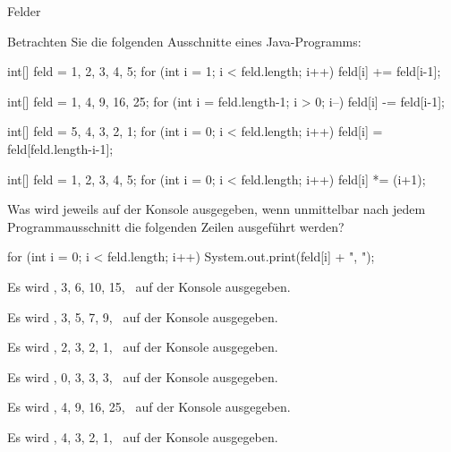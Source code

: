 \begin{exercise}{Felder}
\begin{body}
Betrachten Sie die folgenden Ausschnitte eines Java-Programms:
\begin{parts}
\item 
\begin{displaycode}
    int[] feld = {1, 2, 3, 4, 5};
    for (int i = 1; i < feld.length; i++) {
         feld[i] += feld[i-1];
    }
\end{displaycode}

\item
\begin{displaycode}
    int[] feld = {1, 4, 9, 16, 25};
    for (int i = feld.length-1; i > 0; i--) {
        feld[i] -= feld[i-1];
    }
\end{displaycode}


\item
\begin{displaycode}
    int[] feld = {5, 4, 3, 2, 1};
    for (int i = 0; i < feld.length; i++) {
        feld[i] = feld[feld.length-i-1];
    }
\end{displaycode}

\item
\begin{displaycode}
    int[] feld = {1, 2, 3, 4, 5};
    for (int i = 0; i < feld.length; i++) {
        feld[i] *= (i+1);
    }
\end{displaycode}
\end{parts}
Was wird jeweils auf der Konsole ausgegeben, wenn unmittelbar nach jedem Programmausschnitt die folgenden Zeilen
ausgeführt werden?
\medskip
\begin{displaycode}
    for (int i = 0; i < feld.length; i++) {
        System.out.print(feld[i] + ", ");
    }
\end{displaycode}
\end{body}


\begin{solution}
\begin{parts}
\item
Es wird , 3, 6, 10, 15, \grqq\ auf der Konsole ausgegeben.

\item
Es wird , 3, 5, 7, 9, \grqq\ auf der Konsole ausgegeben.

\item
Es wird , 2, 3, 2, 1, \grqq\ auf der Konsole ausgegeben.

\item
Es wird , 0, 3, 3, 3, \grqq\ auf der Konsole ausgegeben.

\item
Es wird , 4, 9, 16, 25, \grqq\ auf der Konsole ausgegeben.

\item
Es wird , 4, 3, 2, 1, \grqq\ auf der Konsole ausgegeben.
\end{parts}
\end{solution}
\end{exercise}
